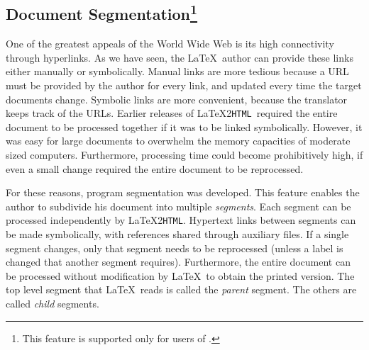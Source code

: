 \documentclass[dvips]{article}
\newcommand{\latextohtml}{\LaTeX 2\texttt{HTML}}
\begin{document}
\subsection{Document Segmentation\protect\footnote{This feature
is supported only for users of \LaTeXe.}\label{Segmentation}}
\begin{changebar}
One of the greatest appeals of the World Wide Web is its high
connectivity through hyperlinks.  As we have seen, the \LaTeX\ 
author can provide these links either manually or symbolically.
Manual links are more tedious because a URL must be provided
by the author for every link, and updated every time the target
documents change.
Symbolic links are more convenient, because the translator
keeps track of the URLs.  Earlier releases of \latextohtml\ 
required the entire document to be processed together if it
was to be linked symbolically.  However, it was easy for
large documents to overwhelm the memory capacities of moderate
sized computers.  Furthermore, processing time could become
prohibitively high, if even a small change required the
entire document to be reprocessed.

For these reasons, program segmentation was developed.
This feature enables the author to subdivide his document
into multiple \textit{segments}\label{segments}.
Each segment can be processed independently by \latextohtml.
Hypertext links between segments can be made symbolically,
with references shared through
auxiliary files.  If a single segment changes, only that
segment needs to be reprocessed (unless a label is changed
that another segment requires).  Furthermore, the entire
document can be processed without modification by \LaTeX\ 
to obtain the printed version.  The top level segment
that \LaTeX\ reads is called the \emph{parent} segment.  The
others are called \emph{child} segments.


\end{changebar}
\end{document}
